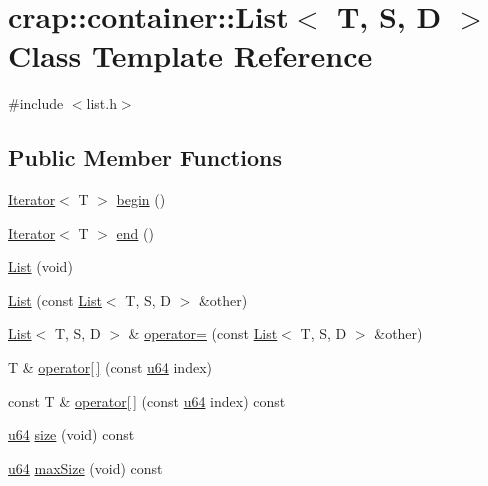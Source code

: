 \hypertarget{classcrap_1_1container_1_1_list}{\section{crap\-:\-:container\-:\-:List$<$ T, S, D $>$ Class Template Reference}
\label{classcrap_1_1container_1_1_list}
}


{\ttfamily \#include $<$list.\-h$>$}

\subsection*{Public Member Functions}
\begin{DoxyCompactItemize}
\item 
\hyperlink{class_iterator}{Iterator}$<$ T $>$ \hyperlink{classcrap_1_1container_1_1_list_acbb19f69f1378d0d36d9a4ea17595673}{begin} ()
\item 
\hyperlink{class_iterator}{Iterator}$<$ T $>$ \hyperlink{classcrap_1_1container_1_1_list_a59179e116c59aaed4737b4de74147f38}{end} ()
\item 
\hyperlink{classcrap_1_1container_1_1_list_ab56b5acae6b9022f080f5c25189ababb}{List} (void)
\item 
\hyperlink{classcrap_1_1container_1_1_list_abda61f87237a87b37b8cf0818725700d}{List} (const \hyperlink{classcrap_1_1container_1_1_list}{List}$<$ T, S, D $>$ \&other)
\item 
\hyperlink{classcrap_1_1container_1_1_list}{List}$<$ T, S, D $>$ \& \hyperlink{classcrap_1_1container_1_1_list_a16d813f42651844fff7fa8c2719f19a6}{operator=} (const \hyperlink{classcrap_1_1container_1_1_list}{List}$<$ T, S, D $>$ \&other)
\item 
T \& \hyperlink{classcrap_1_1container_1_1_list_aa133af9cfb90b5f0c6068e5ae8532f70}{operator\mbox{[}$\,$\mbox{]}} (const \hyperlink{types_8h_a3f7e2bcbb0b4c338f3c4f6c937cd4234}{u64} index)
\item 
const T \& \hyperlink{classcrap_1_1container_1_1_list_a9e7bb6861d0c924cb09e06334ac7cce1}{operator\mbox{[}$\,$\mbox{]}} (const \hyperlink{types_8h_a3f7e2bcbb0b4c338f3c4f6c937cd4234}{u64} index) const 
\item 
\hyperlink{types_8h_a3f7e2bcbb0b4c338f3c4f6c937cd4234}{u64} \hyperlink{classcrap_1_1container_1_1_list_a855e3d38e21983e3ab0863c1092a9e42}{size} (void) const 
\item 
\hyperlink{types_8h_a3f7e2bcbb0b4c338f3c4f6c937cd4234}{u64} \hyperlink{classcrap_1_1container_1_1_list_aece5bc32f10eca22dd49d9d839169db9}{max\-Size} (void) const 

\end{DoxyCompactItemize}
